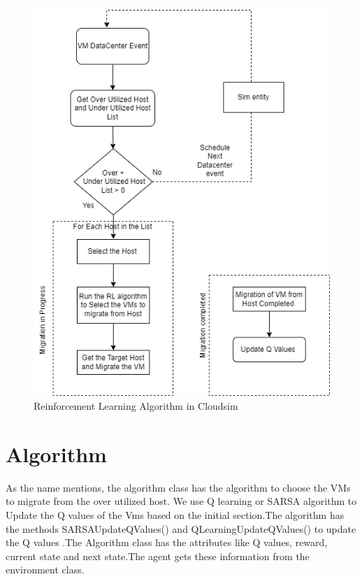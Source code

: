 \documentclass[a4paper,12pt]{Classes/RoboticsLaTeX}
\begin{document}
       \begin{figure}[H]
           \centering
           \includegraphics[width=1.0\linewidth]{Figures/VM_Migration.png}
           \caption{ Reinforcement Learning Algorithm in Cloudsim}
           \label{fig:enter-label}
       \end{figure}

       \section{Algorithm}
       As the name mentions, the algorithm class has the algorithm to choose the VMs to migrate from the over utilized host. We use Q learning or SARSA  algorithm to Update the Q values of the Vms based on the initial section.The algorithm has the methods SARSAUpdateQValues() and QLearningUpdateQValues() to update the Q values .The Algorithm class has the attributes like Q values, reward, current state and next state.The agent gets these information from the environment class.
\end{document}

